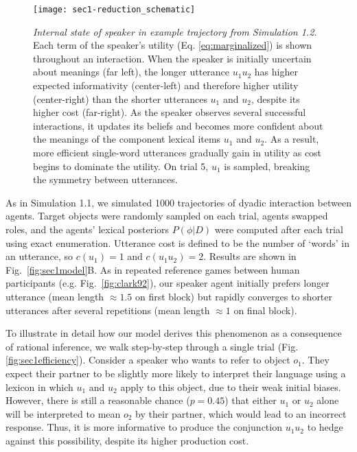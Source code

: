 \begin{figure*}[t]
\centering
    \texttt{[image: sec1-reduction\_schematic]}
    \vspace{1em}
  \caption{\emph{Internal state of speaker in example trajectory from Simulation 1.2.} Each term of the speaker's utility (Eq. \ref{eq:marginalized}) is shown throughout an interaction. When the speaker is initially uncertain about meanings (far left), the longer utterance $u_1u_2$ has higher expected informativity (center-left) and therefore higher utility (center-right) than the shorter utterances $u_1$ and $u_2$, despite its higher cost (far-right). As the speaker observes several successful interactions, it updates its beliefs and becomes more confident about the meanings of the component lexical items $u_1$ and $u_2$. As a result, more efficient single-word utterances gradually gain in utility as cost begins to dominate the utility. On trial 5, $u_1$ is sampled, breaking the symmetry between utterances.}
  \label{fig:sec1internals}
\end{figure*}

As in Simulation 1.1, we simulated 1000 trajectories of dyadic interaction between agents.
Target objects were randomly sampled on each trial, agents swapped roles, and the agents' lexical posteriors $P(\phi | D)$ were computed after each trial using exact enumeration. 
Utterance cost is defined to be the number of `words' in an utterance, so $c(u_1) =1$ and $c(u_1u_2)=2$.
Results are shown in Fig.~\ref{fig:sec1model}B.
As in repeated reference games between human participants (e.g. Fig.~\ref{fig:clark92}), our speaker agent initially prefers longer utterance (mean length $\approx 1.5$ on first block) but rapidly converges to shorter utterances after several repetitions (mean length $\approx 1$ on final block).

To illustrate in detail how our model derives this phenomenon as a consequence of rational inference, we walk step-by-step through a single trial (Fig. \ref{fig:sec1efficiency}).
Consider a speaker who wants to refer to object $o_1$. 
They expect their partner to be slightly more likely to interpret their language using a lexicon in which $u_{1}$ and $u_{2}$ apply to this object, due to their weak initial biases. 
However, there is still a reasonable chance ($p=0.45$) that either $u_1$ or $u_2$ alone will be interpreted to mean $o_2$ by their partner, which would lead to an incorrect response. 
Thus, it is more informative to produce the conjunction $u_{1}u_{2}$ to hedge against this possibility, despite its higher production cost. 

